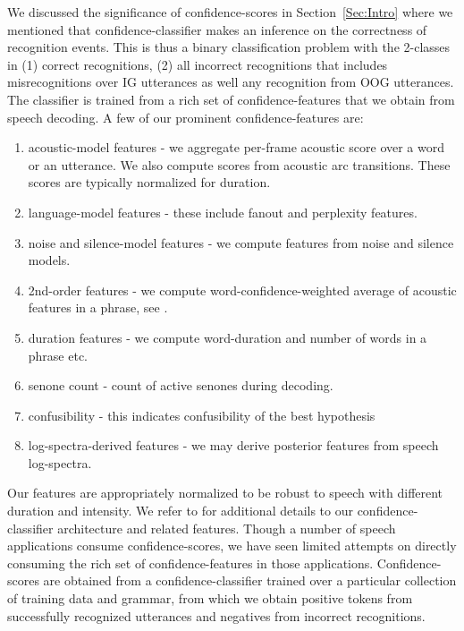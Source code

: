 We discussed the significance of confidence-scores in Section~\ref{Sec:Intro} where we mentioned that
confidence-classifier makes an inference on the correctness of recognition events. This is thus a binary
classification problem \cite{Bishop} with the 2-classes in (1) correct recognitions, (2) all incorrect
recognitions that includes misrecognitions over IG utterances as well any recognition
from OOG utterances. The classifier is trained from a rich set of confidence-features that we obtain from speech decoding.
A few of our prominent confidence-features are:
\begin{enumerate}
  \item acoustic-model features - we aggregate per-frame acoustic score over a word or an utterance. We also compute scores from acoustic arc transitions. These scores are typically normalized for duration.
  \item language-model features - these include fanout and perplexity features.
  \item noise and silence-model features - we compute features from noise and silence models.
  \item 2nd-order features - we compute word-confidence-weighted average of acoustic features in a phrase, see \cite{Posen1}.
  \item duration features - we compute word-duration and number of words in a phrase etc.
  \item senone count - count of active senones during decoding.
  \item confusibility - this indicates confusibility of the best hypothesis
  \item log-spectra-derived features - we may derive posterior features from speech log-spectra.
\end{enumerate}
Our features are appropriately normalized to be robust to speech with different duration and intensity. We refer to \cite{Posen1} for additional details to our confidence-classifier architecture and related features. Though a number of speech applications consume confidence-scores, we have seen limited attempts on directly consuming the rich set of confidence-features in those applications. Confidence-scores are obtained from a confidence-classifier trained over a particular collection of training data and grammar, from which we obtain positive tokens from successfully recognized utterances and negatives from incorrect recognitions. 


